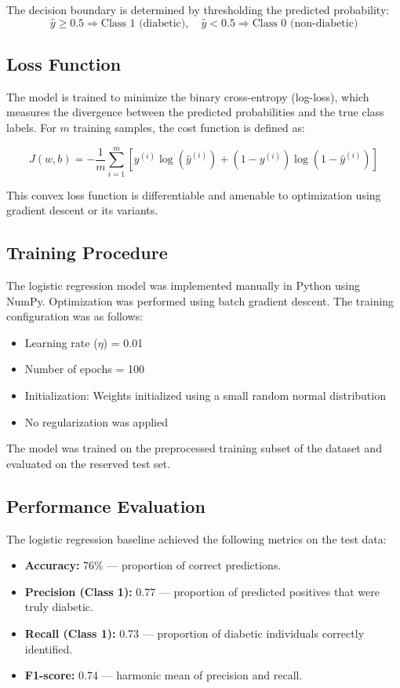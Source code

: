 \documentclass[12pt]{article}
\begin{document}
The decision boundary is determined by thresholding the predicted probability: 
\[
\hat{y} \geq 0.5 \Rightarrow \text{Class 1 (diabetic)}, \quad \hat{y} < 0.5 \Rightarrow \text{Class 0 (non-diabetic)}
\]

\subsection{Loss Function}

The model is trained to minimize the binary cross-entropy (log-loss), which measures the divergence between the predicted probabilities and the true class labels. For \( m \) training samples, the cost function is defined as:

\[
J(w, b) = - \frac{1}{m} \sum_{i=1}^{m} \left[ y^{(i)} \log(\hat{y}^{(i)}) + (1 - y^{(i)}) \log(1 - \hat{y}^{(i)}) \right]
\]

This convex loss function is differentiable and amenable to optimization using gradient descent or its variants.

\subsection{Training Procedure}

The logistic regression model was implemented manually in Python using NumPy. Optimization was performed using batch gradient descent. The training configuration was as follows:

\begin{itemize}
    \item Learning rate (\( \eta \)) = 0.01
    \item Number of epochs = 100
    \item Initialization: Weights initialized using a small random normal distribution
    \item No regularization was applied
\end{itemize}

The model was trained on the preprocessed training subset of the dataset and evaluated on the reserved test set.

\subsection{Performance Evaluation}

The logistic regression baseline achieved the following metrics on the test data:

\begin{itemize}
    \item \textbf{Accuracy:} 76\% — proportion of correct predictions.
    \item \textbf{Precision (Class 1):} 0.77 — proportion of predicted positives that were truly diabetic.
    \item \textbf{Recall (Class 1):} 0.73 — proportion of diabetic individuals correctly identified.
    \item \textbf{F1-score:} 0.74 — harmonic mean of precision and recall.
\end{itemize}
\end{document}
